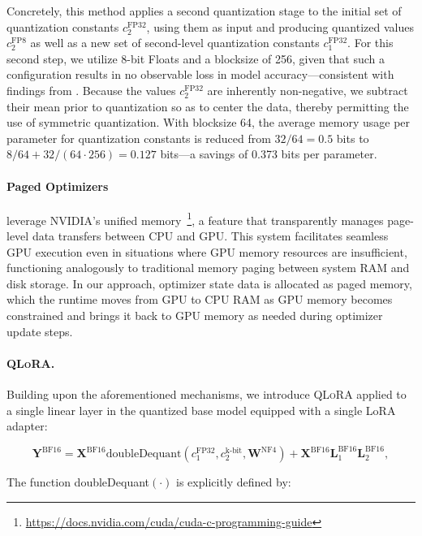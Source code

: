 Concretely, this method applies a second quantization stage to the initial set of quantization constants $c_2^{\text{FP32}}$, using them as input and producing quantized values $c_2^{\text{FP8}}$ as well as a new set of second-level quantization constants $c_1^{\text{FP32}}$. For this second step, we utilize 8-bit Floats and a blocksize of 256, given that such a configuration results in no observable loss in model accuracy—consistent with findings from \citet{dettmers2022case}. Because the values $c_2^{\text{FP32}}$ are inherently non-negative, we subtract their mean prior to quantization so as to center the data, thereby permitting the use of symmetric quantization. With blocksize 64, the average memory usage per parameter for quantization constants is reduced from $32/64=0.5$ bits to $8/64 + 32/(64\cdot256) = 0.127$ bits—a savings of 0.373 bits per parameter.

\paragraph{Paged Optimizers} leverage NVIDIA's unified memory~\footnote{\tiny \url{https://docs.nvidia.com/cuda/cuda-c-programming-guide}}, a feature that transparently manages page-level data transfers between CPU and GPU. This system facilitates seamless GPU execution even in situations where GPU memory resources are insufficient, functioning analogously to traditional memory paging between system RAM and disk storage. In our approach, optimizer state data is allocated as paged memory, which the runtime moves from GPU to CPU RAM as GPU memory becomes constrained and brings it back to GPU memory as needed during optimizer update steps.

\paragraph{\textsc{QLoRA}.} Building upon the aforementioned mechanisms, we introduce \textsc{QLoRA} applied to a single linear layer in the quantized base model equipped with a single LoRA adapter:

\begin{equation}
    \mathbf{Y}^{\text{BF16}} =  \mathbf{X}^{\text{BF16}} \text{doubleDequant}(c_1^{\text{FP32}}, c_2^{\text{k-bit}}, \mathbf{W}^{\text{NF4}}) + \mathbf{X}^{\text{BF16}}\mathbf{L}^{\text{BF16}}_1\mathbf{L}^{\text{BF16}}_2,
\end{equation}

The function doubleDequant$(\cdot)$ is explicitly defined by:

